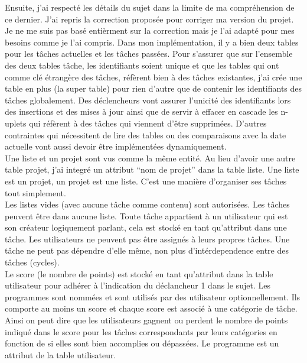 \documentclass[12pt]{article}
\begin{document}
Ensuite, j'ai respecté les détails du sujet dans la limite de ma compréhension
de ce dernier. J'ai repris la correction proposée pour corriger ma version du
projet. Je ne me suis pas basé entièrment sur la correction mais je l'ai adapté
pour mes besoins comme je l'ai compris. Dans mon implémentation, il y a bien
deux tables pour les tâches actuelles et les tâches passées. Pour s'assurer que
sur l'ensemble des deux tables tâche, les identifiants soient unique et que les
tables qui ont comme clé étrangère des tâches, réfèrent bien à des tâches
existantes, j'ai crée une table en plus (la super table) pour rien d'autre que
de contenir les identifiants des tâches globalement. Des déclencheurs vont
assurer l'unicité des identifiants lors des insertions et des mises à jour ainsi
que de servir à effacer en cascade les n-uplets qui réfèrent à des tâches qui
viennent d'être supprimées. D'autres contraintes qui nécessitent de lire des
tables ou des comparaisons avec la date actuelle vont aussi devoir être
implémentées dynamiquement. \\

Une liste et un projet sont vus comme la même entité. Au lieu d'avoir une autre
table projet, j'ai integré un attribut ``nom de projet'' dans la table liste.
Une liste est un projet, un projet est une liste. C'est une manière d'organiser
ses tâches tout simplement. \\

Les listes vides (avec aucune tâche comme contenu) sont autorisées. Les tâches
peuvent être dans aucune liste. Toute tâche appartient à un utilisateur qui est
son créateur logiquement parlant, cela est stocké en tant qu'attribut dans une
tâche. Les utilisateurs ne peuvent pas être assignés à leurs propres tâches.
Une tâche ne peut pas dépendre d'elle même, non plus d'intérdependence entre des
tâches (cycles). \\

Le score (le nombre de points) est stocké en tant qu'attribut dans la table
utilisateur pour adhérer à l'indication du déclancheur 1 dans le sujet.  Les
programmes sont nommées et sont utilisés par des utilisateur optionnellement.
Ils comporte au moins un score et chaque score est associé à une catégorie de
tâche. Ainsi on peut dire que les utilisateurs gagnent ou perdent le nombre de
points indiqué dans le score pour les tâches correspondants par leurs catégories
en fonction de si elles sont bien accomplies ou dépassées.  Le programme est un
attribut de la table utilisateur. \\
\end{document}
